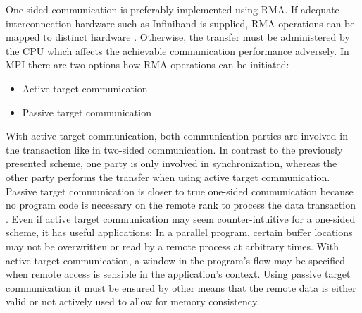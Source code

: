 One-sided communication is preferably implemented using \ac{RMA}. If adequate interconnection hardware such as Infiniband is supplied, \ac{RMA} operations can be mapped to distinct hardware \cite[ch.~3.2]{upc-infiniband}. Otherwise, the transfer must be administered by the \ac{CPU} which affects the achievable communication performance adversely. In \ac{MPI} there are two options how \ac{RMA} operations can be initiated: 
\begin{itemize}
	\item Active target communication
	\item Passive target communication
\end{itemize}
With active target communication, both communication parties are involved in the transaction like in two-sided communication. In contrast to the previously presented scheme, one party is only involved in synchronization, whereas the other party performs the transfer when using active target communication. Passive target communication is closer to true one-sided communication because no program code is necessary on the remote rank to process the data transaction \cite[ch.~11.5]{mpi3-std}. Even if active target communication may seem counter-intuitive for a one-sided scheme, it has useful applications: In a parallel program, certain buffer locations may not be overwritten or read by a remote process at arbitrary times. With active target communication, a window in the program's flow may be specified when remote access is sensible in the application's context. Using passive target communication it must be ensured by other means that the remote data is either valid or not actively used to allow for memory consistency.

